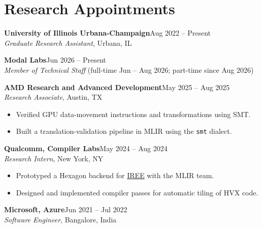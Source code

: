 \documentclass[11pt,letterpaper]{article}
\newcommand{\entry}[2]{\needspace{2.5\baselineskip}\textbf{#1}\hfill #2\\}
\begin{document}
\section{Research Appointments}
\entry{University of Illinois Urbana-Champaign}{Aug 2022 -- Present}
\textit{Graduate Research Assistant}, Urbana, IL

\vspace{4pt}
\entry{Modal Labs}{Jun 2026 -- Present}
\textit{Member of Technical Staff} (full-time Jun -- Aug 2026; part-time since Aug 2026)

\vspace{4pt}
\entry{AMD Research and Advanced Development}{May 2025 -- Aug 2025}
\textit{Research Associate}, Austin, TX
\begin{itemize}
  \item Verified GPU data-movement instructions and transformations using SMT.
  \item Built a translation-validation pipeline in MLIR using the \texttt{smt} dialect.
\end{itemize}

\vspace{4pt}
\entry{Qualcomm, Compiler Labs}{May 2024 -- Aug 2024}
\textit{Research Intern}, New York, NY
\begin{itemize}
  \item Prototyped a Hexagon backend for \href{https://iree.dev}{IREE} with the MLIR team.
  \item Designed and implemented compiler passes for automatic tiling of HVX code.
\end{itemize}

\vspace{4pt}
\entry{Microsoft, Azure}{Jun 2021 -- Jul 2022}
\textit{Software Engineer}, Bangalore, India
\end{document}
